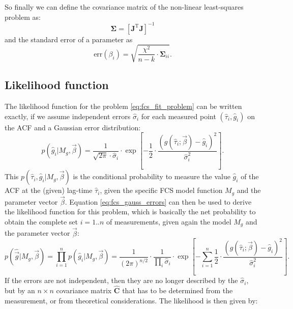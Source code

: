 \documentclass[a4paper,notitlepage]{article}
\newcommand{\mat}[1]{\mathrm{\mathbf{#1}}}
\begin{document}
So finally we can define the covariance matrix of the non-linear least-squares problem as:
\begin{equation}\label{eq:varcov_noerrors}
   \mat{\Sigma}=\left[\mat{J}^\mathrm{T}\mat{J}\right]^{-1}
\end{equation}
and the standard error of a parameter as
\begin{equation}\label{eq:stderr_noerrors}
   \mbox{err}(\beta_i)=\sqrt{\frac{\chi^2}{n-k}\cdot\mat{\Sigma}_{ii}}.
\end{equation}








\subsection{Likelihood function}
The likelihood function for the problem \eqref{eq:fcs_fit_problem} can be written exactly, if we assume independent errors $\hat{\sigma}_i$ for each measured point $(\hat{\tau}_i, \hat{g}_i)$ on the ACF and a Gaussian error distribution:
\begin{equation}\label{eq:fcs_gauss_errors}
  p(\hat{g}_i|M_g,\vec{\beta})=\frac{1}{\sqrt{2\pi}\cdot\hat{\sigma}_i}\cdot\exp\left[-\frac{1}{2}\cdot\frac{\left(g(\hat{\tau}_i;\vec{\beta})-\hat{g}_i\right)^2}{\hat{\sigma}_i^2}\right].
\end{equation}
This $p(\hat{\tau}_i,\hat{g}_i|M_g,\vec{\beta})$ is the conditional probability to measure the value $\hat{g}_i$ of the ACF at the (given) lag-time $\hat{\tau}_i$, given the specific FCS model function $M_g$ and the parameter vector $\vec{\beta}$. Equation \eqref{eq:fcs_gauss_errors} can then be used to derive the likelihood function for this problem, which is basically the net probability to obtain the complete set $i=1..n$ of measurements, given again the model $M_g$ and the parameter vector $\vec{\beta}$:
\begin{equation}\label{eq:fcs_likelihood_simple}
  p(\hat{\vec{g}}|M_g,\vec{\beta})=\prod\limits_{i=1}^np(\hat{g}_i|M_g,\vec{\beta})%
  =\frac{1}{(2\pi)^{n/2}}\cdot\frac{1}{\prod\limits_i\hat{\sigma}_i}\cdot\exp\left[-\sum\limits_{i=1}^n\frac{1}{2}\cdot\frac{\left(g(\hat{\tau}_i;\vec{\beta})-\hat{g}_i\right)^2}{\hat{\sigma}_i^2}\right].
\end{equation}
If the errors are not independent, then they are no longer described by the $\hat{\sigma}_i$, but by an $n\times n$ covariance matrix $\hat{\mat{C}}$ that has to be determined from the measurement, or from theoretical considerations. The likelihood is then given by:
\end{document}

